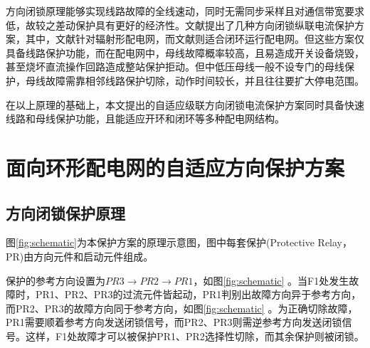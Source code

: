 方向闭锁原理能够实现线路故障的全线速动，同时无需同步采样且对通信带宽要求低，故较之差动保护具有更好的经济性。文献\cite{liukai2014zhu,nikolaidis2016communication,libin2010han}提出了几种方向闭锁纵联电流保护方案，其中，文献\cite{liukai2014zhu,nikolaidis2016communication}针对辐射形配电网，而文献\cite{libin2010han}则适合闭环运行配电网。但这些方案仅具备线路保护功能，而在配电网中，母线故障概率较高，且易造成开关设备烧毁，甚至烧坏直流操作回路造成整站保护拒动。但中低压母线一般不设专门的母线保护，母线故障需靠相邻线路保护切除，动作时间较长，并且往往要扩大停电范围。

在以上原理的基础上，本文提出的自适应级联方向闭锁电流保护方案同时具备快速线路和母线保护功能，且能适应开环和闭环等多种配电网结构。

\section{面向环形配电网的自适应方向保护方案}

\subsection{方向闭锁保护原理}

图\ref{fig:schematic}为本保护方案的原理示意图，图中每套保护(Protective Relay，PR)由方向元件和启动元件组成。

\begin{figure}
    \centering
\end{figure}

保护的参考方向设置为$PR3 \to PR2 \to PR1$，如图\ref{fig:schematic} 。当F1处发生故障时，PR1、PR2、PR3的过流元件皆起动，PR1判别出故障方向异于参考方向，而PR2、PR3的故障方向同于参考方向，如图\ref{fig:schematic} 。为正确切除故障，PR1需要顺着参考方向发送闭锁信号，而PR2、PR3则需逆参考方向发送闭锁信号。这样，F1处故障才可以被保护PR1、PR2选择性切除，而其余保护则被闭锁。

